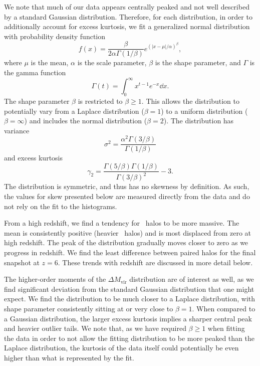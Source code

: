 We note that much of our data appears centrally peaked and not well described by a standard Gaussian distribution.  Therefore, for each distribution, in order to additionally account for excess kurtosis, we fit a generalized normal distribution \citep{doi:10.1080/02664760500079464} with probability density function
\begin{equation} \label{eq:generalized_normal}
	f(x) = \frac{ \beta }{2 \alpha \Gamma(1 / \beta)} e^{\left( \left| x - \mu \right| / \alpha \right)^{\beta}},
\end{equation}
where $\mu$ is the mean, $\alpha$ is the scale parameter, $\beta$ is the shape parameter, and $\Gamma$ is the gamma function
\begin{equation} \label{eq:gamma_function}
	\Gamma(t) = \int_{0}^{\infty} x^{t-1} e^{-x} \dd x.
\end{equation}
The shape parameter $\beta$ is restricted to $\beta \geq 1$.  This allows the distribution to potentially vary from a Laplace distribution ($\beta = 1$) to a uniform distribution ($\beta = \infty$) and includes the normal distribution ($\beta = 2$).  The distribution has variance
\begin{equation} \label{eq:variance}
	\sigma^{2} = \frac{ \alpha^{2} \Gamma(3/\beta) }{ \Gamma(1/\beta) }
\end{equation}
and excess kurtosis
\begin{equation} \label{eq:kurtosis}
	\gamma_{2} = \frac{ \Gamma(5/\beta) \Gamma(1/\beta) }{ \Gamma(3/\beta)^{2} } - 3.
\end{equation}
The distribution is symmetric, and thus has no skewness by definition.  As such, the values for skew presented below are measured directly from the data and do not rely on the fit to the histograms.

From a high redshift, we find a tendency for \lpt\ halos to be more massive.  The mean is consistently positive (heavier \lpt\ halos) and is most displaced from zero at high redshift.  The peak of the distribution gradually moves closer to zero as we progress in redshift.  We find the least difference between paired halos for the final snapshot at $z = 6$.  These trends with redshift are discussed in more detail below.

The higher-order moments of the $\Delta M_{\mathrm{vir}}$ distribution are of interest as well, as we find significant deviation from the standard Gaussian distribution that one might expect.  We find the distribution to be much closer to a Laplace distribution, with shape parameter consistently sitting at or very close to $\beta = 1$.  When compared to a Gaussian distribution, the larger excess kurtosis implies a sharper central peak and heavier outlier tails.  We note that, as we have required $\beta \geq 1$ when fitting the data in order to not allow the fitting distribution to be more peaked than the Laplace distribution, the kurtosis of the data itself could potentially be even higher than what is represented by the fit.

